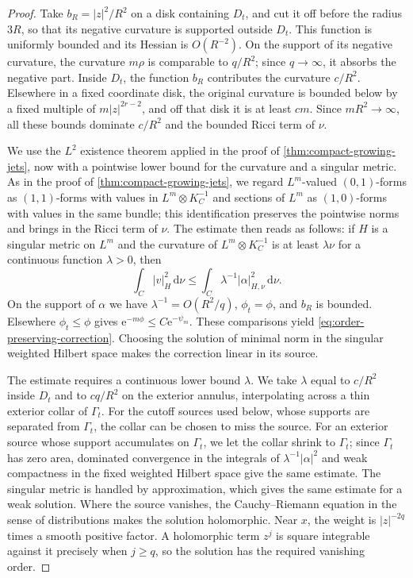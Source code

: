 \begin{proof}
Take $b_R=|z|^2/R^2$ on a disk containing $D_t$, and cut it off before the radius $3R$, so that its negative curvature is supported outside $D_t$. This function is uniformly bounded and its Hessian is $O(R^{-2})$. On the support of its negative curvature, the curvature $m\rho$ is comparable to $q/R^2$; since $q\to\infty$, it absorbs the negative part. Inside $D_t$, the function $b_R$ contributes the curvature $c/R^2$. Elsewhere in a fixed coordinate disk, the original curvature is bounded below by a fixed multiple of $m|z|^{2r-2}$, and off that disk it is at least $cm$. Since $mR^2\to\infty$, all these bounds dominate $c/R^2$ and the bounded Ricci term of $\nu$.

We use the $L^2$ existence theorem applied in the proof of \cref{thm:compact-growing-jets}, now with a pointwise lower bound for the curvature and a singular metric. As in the proof of \cref{thm:compact-growing-jets}, we regard $L^m$-valued $(0,1)$-forms as $(1,1)$-forms with values in $L^m\otimes K_C^{-1}$ and sections of $L^m$ as $(1,0)$-forms with values in the same bundle; this identification preserves the pointwise norms and brings in the Ricci term of $\nu$. The estimate then reads as follows: if $H$ is a singular metric on $L^m$ and the curvature of $L^m\otimes K_C^{-1}$ is at least $\lambda\nu$ for a continuous function $\lambda>0$, then
\[
 \int_C|v|_H^2\,\mathrm{d}\nu
 \leq\int_C\lambda^{-1}|\alpha|_{H,\nu}^2\,\mathrm{d}\nu.
\]
On the support of $\alpha$ we have $\lambda^{-1}=O(R^2/q)$, $\phi_t=\phi$, and $b_R$ is bounded. Elsewhere $\phi_t\leq\phi$ gives
$\mathrm{e}^{-m\phi}\leq C\mathrm{e}^{-\psi_m}$. These comparisons yield \eqref{eq:order-preserving-correction}. Choosing the solution of minimal norm in the singular weighted Hilbert space makes the correction linear in its source.

The estimate requires a continuous lower bound $\lambda$. We take $\lambda$ equal to $c/R^2$ inside $D_t$ and to $cq/R^2$ on the exterior annulus, interpolating across a thin exterior collar of $\Gamma_t$. For the cutoff sources used below, whose supports are separated from $\Gamma_t$, the collar can be chosen to miss the source. For an exterior source whose support accumulates on $\Gamma_t$, we let the collar shrink to $\Gamma_t$; since $\Gamma_t$ has zero area, dominated convergence in the integrals of $\lambda^{-1}|\alpha|^2$ and weak compactness in the fixed weighted Hilbert space give the same estimate. The singular metric is handled by approximation, which gives the same estimate for a weak solution. Where the source vanishes, the Cauchy--Riemann equation in the sense of distributions makes the solution holomorphic.
Near $x$, the weight is $|z|^{-2q}$ times a smooth positive factor. A holomorphic term $z^j$ is square integrable against it precisely when $j\geq q$, so the solution has the required vanishing order.
\end{proof}

